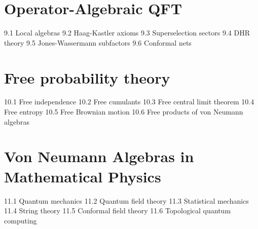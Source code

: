\section{Operator-Algebraic QFT}
9.1 Local algebras
9.2 Haag-Kastler axioms
9.3 Superselection sectors
9.4 DHR theory
9.5 Jones-Wassermann subfactors
9.6 Conformal nets
\section{Free probability theory}
10.1 Free independence
10.2 Free cumulants
10.3 Free central limit theorem
10.4 Free entropy
10.5 Free Brownian motion
10.6 Free products of von Neumann algebras
\section{Von Neumann Algebras in Mathematical Physics}
11.1 Quantum mechanics
11.2 Quantum field theory
11.3 Statistical mechanics
11.4 String theory
11.5 Conformal field theory
11.6 Topological quantum computing
